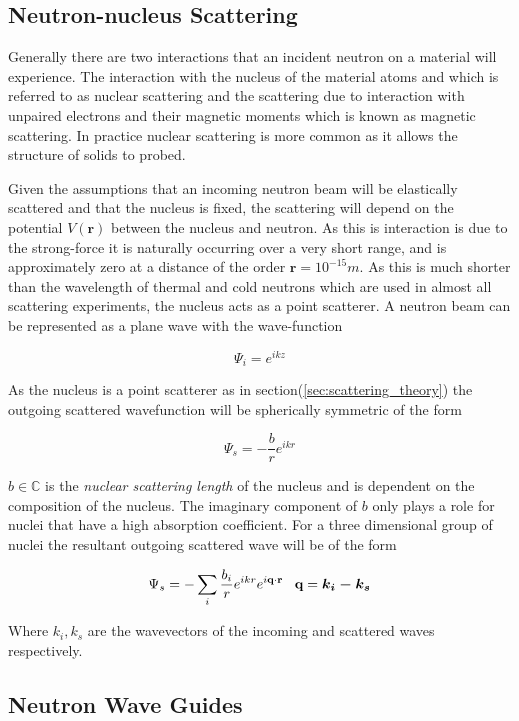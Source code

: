 \subsection{Neutron-nucleus Scattering}
Generally there are two interactions that an incident neutron on a material will experience. The interaction with the nucleus of the material atoms and which is referred to as nuclear scattering and the scattering due to interaction with unpaired electrons and their magnetic moments which is known as magnetic scattering. In practice nuclear scattering is more common as it allows the structure of solids to probed. 

Given the assumptions that an incoming neutron beam will be elastically scattered and that the nucleus is fixed, the scattering will depend on the potential $V(\textbf{r})$ between the nucleus and neutron. As this is interaction is due to the strong-force it is naturally occurring over a very short range, and is approximately zero at a distance of the order $\textbf{r}=10^{-15}m$. As this is much shorter than the wavelength of thermal and cold neutrons which are used in almost all scattering experiments, the nucleus acts as a point scatterer. A neutron beam can be represented as a plane wave with the wave-function

\begin{equation}
\Psi_i = e^{ikz}
\label{eq:neutronBeam}
\end{equation}

As the nucleus is a point scatterer as in section(\ref{sec:scattering_theory}) the outgoing scattered wavefunction will be spherically symmetric of the form 

\begin{equation}
\Psi_s = -\frac{b}{r}e^{ikr}
\label{eq:scatteredWave}
\end{equation}

$b \in \mathbb{C}$ is the \textit{nuclear scattering length} of the nucleus and is dependent on the composition of the nucleus. The imaginary component of $b$ only plays a role for nuclei that have a high absorption coefficient. For a three dimensional group of nuclei the resultant outgoing scattered wave will be of the form 

\begin{equation}
\Psi_s = -\sum \limits_i \frac{b_i}{r} e^{ikr} e^{i \textbf{q} \cdot \textbf{r}} \,\,\,\,\,  \textbf{q}= \mbox{\boldmath$k_i-k_s$}
\label{eq:latticeScatter}
\end{equation}

Where \boldmath$k_i,k_s$ are the wavevectors of the incoming and scattered waves respectively. 

\subsection{Neutron Wave Guides}

